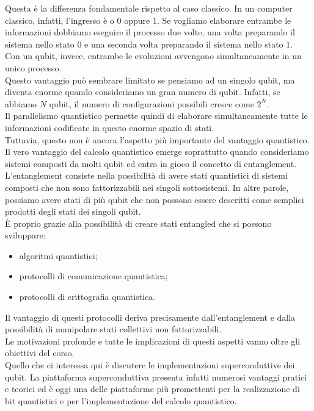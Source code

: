 Questa è la differenza fondamentale rispetto al caso classico. In un computer classico, infatti, l'ingresso è o $0$ oppure $1$. Se vogliamo elaborare entrambe le informazioni dobbiamo eseguire il processo due volte, una volta preparando il sistema nello stato $0$ e una seconda volta preparando il sistema nello stato $1$.\\
Con un qubit, invece, entrambe le evoluzioni avvengono simultaneamente in un unico processo.\\
Questo vantaggio può sembrare limitato se pensiamo ad un singolo qubit, ma diventa enorme quando consideriamo un gran numero di qubit. Infatti, se abbiamo $N$ qubit, il numero di configurazioni possibili cresce come $2^N$.\\
Il parallelismo quantistico permette quindi di elaborare simultaneamente tutte le informazioni codificate in questo enorme spazio di stati.\\
Tuttavia, questo non è ancora l'aspetto più importante del vantaggio quantistico. Il vero vantaggio del calcolo quantistico emerge soprattutto quando consideriamo sistemi composti da molti qubit ed entra in gioco il concetto di entanglement. L'entanglement consiste nella possibilità di avere stati quantistici di sistemi composti che non sono fattorizzabili nei singoli sottosistemi. In altre parole, possiamo avere stati di più qubit che non possono essere descritti come semplici prodotti degli stati dei singoli qubit.\\
È proprio grazie alla possibilità di creare stati entangled che si possono sviluppare:
\begin{itemize}[leftmargin=0.5cm]
    \item algoritmi quantistici;
    \item protocolli di comunicazione quantistica;
    \item protocolli di crittografia quantistica.
\end{itemize}
Il vantaggio di questi protocolli deriva precisamente dall'entanglement e dalla possibilità di manipolare stati collettivi non fattorizzabili.\\
Le motivazioni profonde e tutte le implicazioni di questi aspetti vanno oltre gli obiettivi del corso.\\
Quello che ci interessa qui è discutere le implementazioni superconduttive dei qubit. La piattaforma superconduttiva presenta infatti numerosi vantaggi pratici e teorici ed è oggi una delle piattaforme più promettenti per la realizzazione di bit quantistici e per l'implementazione del calcolo quantistico.
